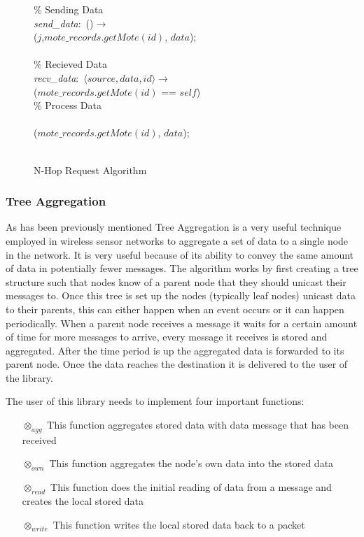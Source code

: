 \begin{figure}[H]
\begin{boxedminipage}{\linewidth}
    \null\qq \% Sending Data\\
    \null\qq \emph{send\_data}:~()$\rightarrow$\\
    \null\qq\qq {}($j$,$mote\_records.getMote(id)$, $data$);\\~\\
    \null\qq \% Recieved Data\\
    \null\qq \emph{recv\_data}:~$\langle source, data, id\rangle \rightarrow$\\
    \null\qq\qq {} ($mote\_records.getMote(id)$ == $self$) \\
    \null\qq\qq\qq \% Process Data\\
    \null\qq\qq {}\\
    \null\qq\qq\qq {}($mote\_records.getMote(id)$, $data$);\\
    \null\qq\qq {}\\
  \end{boxedminipage}
  \caption{N-Hop Request Algorithm}
  \label{fig:n-hop-req-algorithm}
\end{figure}

\subsubsection{Tree Aggregation}

As has been previously mentioned Tree Aggregation is a very useful technique employed in wireless sensor networks to aggregate a set of data to a single node in the network. It is very useful because of its ability to convey the same amount of data in potentially fewer messages. The algorithm works by first creating a tree structure such that nodes know of a parent node that they should unicast their messages to. Once this tree is set up the nodes (typically leaf nodes) unicast data to their parents, this can either happen when an event occurs or it can happen periodically. When a parent node receives a message it waits for a certain amount of time for more messages to arrive, every message it receives is stored and aggregated. After the time period is up the aggregated data is forwarded to its parent node. Once the data reaches the destination it is delivered to the user of the library.


The user of this library needs to implement four important functions:
\begin{enumerate}
\item[$\otimes_{agg}$] This function aggregates stored data with data message that has been received
\item[$\otimes_{own}$] This function aggregates the node's own data into the stored data
\item[$\otimes_{read}$] This function does the initial reading of data from a message and creates the local stored data
\item[$\otimes_{write}$] This function writes the local stored data back to a packet
\end{enumerate}


